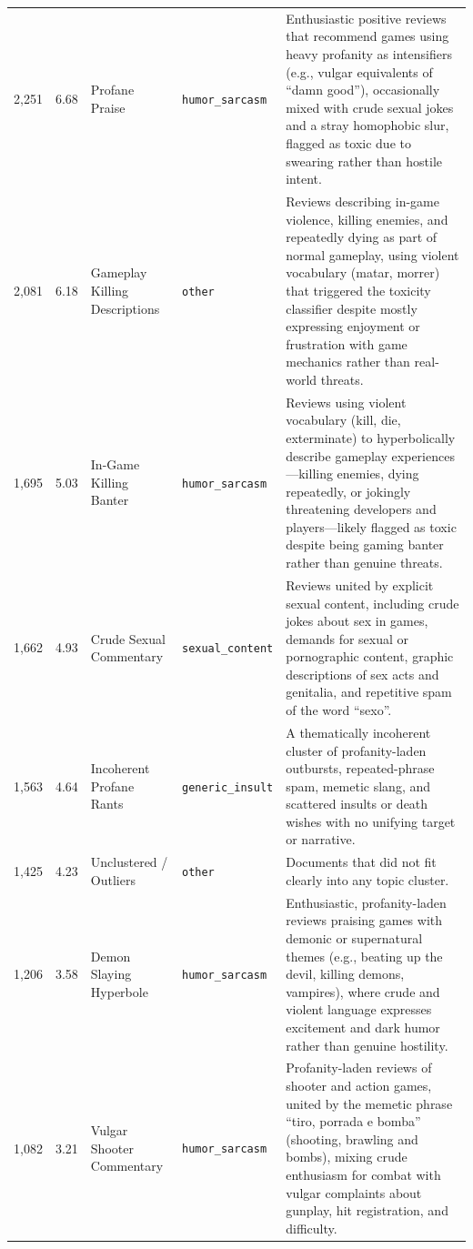 {\begin{longtable}{p{0.9cm}p{0.6cm}p{3cm}lp{6.1cm}}
    2{,}251 & 6.68 & Profane Praise & \texttt{humor\_\allowbreak sarcasm} & Enthusiastic positive reviews that recommend games using heavy profanity as intensifiers (e.g., vulgar equivalents of ``damn good''), occasionally mixed with crude sexual jokes and a stray homophobic slur, flagged as toxic due to swearing rather than hostile intent. \\
    2{,}081 & 6.18 & Gameplay Killing Descriptions & \texttt{other} & Reviews describing in-game violence, killing enemies, and repeatedly dying as part of normal gameplay, using violent vocabulary (matar, morrer) that triggered the toxicity classifier despite mostly expressing enjoyment or frustration with game mechanics rather than real-world threats. \\
    1{,}695 & 5.03 & In-Game Killing Banter & \texttt{humor\_\allowbreak sarcasm} & Reviews using violent vocabulary (kill, die, exterminate) to hyperbolically describe gameplay experiences---killing enemies, dying repeatedly, or jokingly threatening developers and players---likely flagged as toxic despite being gaming banter rather than genuine threats. \\
    1{,}662 & 4.93 & Crude Sexual Commentary & \texttt{sexual\_\allowbreak content} & Reviews united by explicit sexual content, including crude jokes about sex in games, demands for sexual or pornographic content, graphic descriptions of sex acts and genitalia, and repetitive spam of the word ``sexo''. \\
    1{,}563 & 4.64 & Incoherent Profane Rants & \texttt{generic\_\allowbreak insult} & A thematically incoherent cluster of profanity-laden outbursts, repeated-phrase spam, memetic slang, and scattered insults or death wishes with no unifying target or narrative. \\
    1{,}425 & 4.23 & Unclustered / Outliers & \texttt{other} & Documents that did not fit clearly into any topic cluster. \\
    1{,}206 & 3.58 & Demon Slaying Hyperbole & \texttt{humor\_\allowbreak sarcasm} & Enthusiastic, profanity-laden reviews praising games with demonic or supernatural themes (e.g., beating up the devil, killing demons, vampires), where crude and violent language expresses excitement and dark humor rather than genuine hostility. \\
    1{,}082 & 3.21 & Vulgar Shooter Commentary & \texttt{humor\_\allowbreak sarcasm} & Profanity-laden reviews of shooter and action games, united by the memetic phrase ``tiro, porrada e bomba'' (shooting, brawling and bombs), mixing crude enthusiasm for combat with vulgar complaints about gunplay, hit registration, and difficulty. \\

\end{longtable}}
